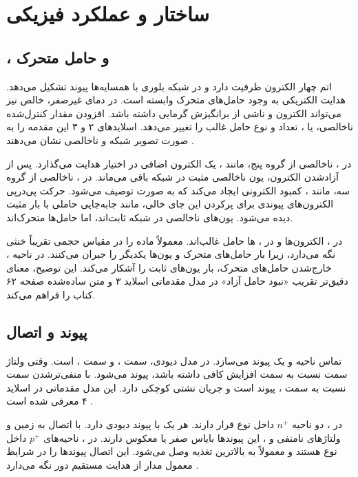 \section{ساختار و عملکرد فیزیکی }
\label{sec:book-mos-structure}
\subsection{،  و حامل متحرک}
اتم  چهار الکترون ظرفیت دارد و در شبکه بلوری با همسایه‌ها پیوند
تشکیل می‌دهد. هدایت الکتریکی به وجود حامل‌های متحرک وابسته است.
در دمای غیرصفر،  خالص نیز می‌تواند الکترون و  ناشی از
برانگیزش گرمایی داشته باشد. افزودن مقدار کنترل‌شده ناخالصی، یا ،
تعداد و نوع حامل غالب را تغییر می‌دهد. اسلایدهای ۲ و ۳ این مقدمه را به صورت
تصویر شبکه و ناخالصی نشان می‌دهند \cite{mos}.

در ، ناخالصی  از گروه پنج، مانند ، یک الکترون
اضافی در اختیار هدایت می‌گذارد. پس از آزادشدن الکترون، یون ناخالصی مثبت در شبکه
باقی می‌ماند. در ، ناخالصی  از گروه سه، مانند
، کمبود الکترونی ایجاد می‌کند که به صورت  توصیف می‌شود.
حرکت پی‌درپی الکترون‌های پیوندی برای پرکردن این جای خالی، مانند جابه‌جایی
حاملی با بار مثبت دیده می‌شود. یون‌های ناخالصی در شبکه ثابت‌اند، اما حامل‌ها متحرک‌اند.

در ، الکترون‌ها و در ، ها حامل غالب‌اند.
 معمولاً ماده را در مقیاس حجمی تقریباً خنثی نگه می‌دارد، زیرا بار
حامل‌های متحرک و یون‌ها یکدیگر را جبران می‌کنند. در ناحیه ،
خارج‌شدن حامل‌های متحرک، بار یون‌های ثابت را آشکار می‌کند.
این توضیح، معنای دقیق‌تر تقریب «نبود حامل آزاد» در مدل مقدماتی اسلاید ۳ و
متن ساده‌شده صفحه ۶۲ کتاب را فراهم می‌کند.

\subsection{پیوند  و اتصال }
تماس ناحیه  و  یک پیوند  می‌سازد.
در مدل دیودی، سمت ،  و سمت ،  است.
وقتی ولتاژ سمت  نسبت به سمت  افزایش کافی داشته باشد، پیوند
 می‌شود. با منفی‌ترشدن سمت  نسبت به سمت ،
پیوند  است و جریان نشتی کوچکی دارد. این مدل مقدماتی
در اسلاید ۴ معرفی شده است \cite{mos}.

در ، دو ناحیه \(n^+\) داخل  نوع  قرار دارند.
هر یک با  پیوند دیودی دارد. با اتصال  به زمین و ولتاژهای
نامنفی  و ، این پیوندها بایاس صفر یا معکوس دارند.
در ، ناحیه‌های \(p^+\) داخل  نوع  هستند و معمولاً
 به بالاترین تغذیه وصل می‌شود. این اتصال پیوندها را در شرایط معمول
مدار از هدایت مستقیم دور نگه می‌دارد \cite[صفحات ۶۲ تا ۶۴]{weste}.

